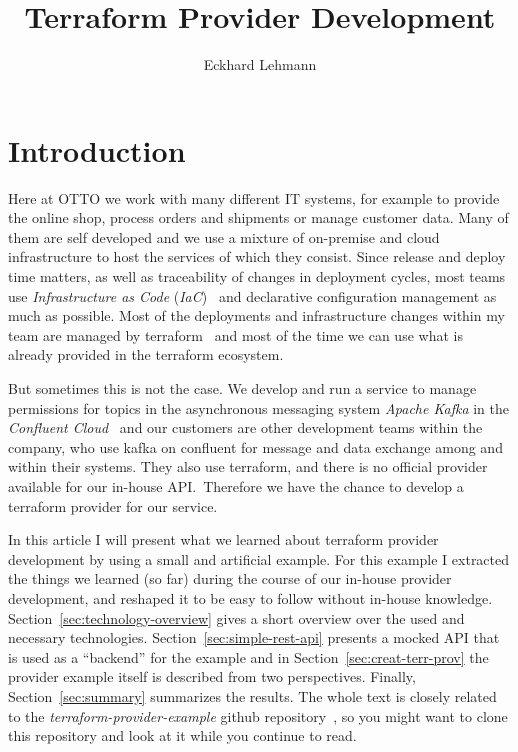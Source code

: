 \documentclass[paper=a4,11pt,numbers=noenddot]{article}
\title{Terraform Provider Development}
\author{Eckhard Lehmann}
\begin{document}
\maketitle
\tableofcontents

\section{Introduction}

Here at OTTO we work with many different IT systems, for example to provide the online shop, process orders and shipments or manage customer data. Many of them are self developed and we use a mixture of on-premise and cloud infrastructure to host the services of which they consist. Since release and deploy time matters, as well as traceability of changes in deployment cycles, most teams use \emph{Infrastructure as Code} (\emph{IaC})~\autocite{morris_infrastructure_as_code_2025} and declarative configuration management as much as possible. Most of the deployments and infrastructure changes within my team are managed by terraform~\autocite{noauthor_terraform_nodate} and most of the time we can use what is already provided in the terraform ecosystem.

But sometimes this is not the case. We develop and run a service to manage permissions for topics in the asynchronous messaging system \emph{Apache Kafka} in the \emph{Confluent Cloud}~\autocite{noauthor_apache_kafka_nodate, noauthor_confluent_nodate} and our customers are other development teams within the company, who use kafka on confluent for message and data exchange among and within their systems. They also use terraform, and there is no official provider available for our in-house API.\ Therefore we have the chance to develop a terraform provider for our service.

In this article I will present what we learned about terraform provider development by using a small and artificial example. For this example I extracted the things we learned (so far) during the course of our in-house provider development, and reshaped it to be easy to follow without in-house knowledge. Section~\ref{sec:technology-overview} gives a short overview over the used and necessary technologies. Section~\ref{sec:simple-rest-api} presents a mocked API that is used as a ``backend'' for the example and in Section~\ref{sec:creat-terr-prov} the provider example itself is described from two perspectives. Finally, Section~\ref{sec:summary} summarizes the results. The whole text is closely related to the \emph{terraform-provider-example} github repository~\autocite{ecky-l_terraform-provider-example_nodate}, so you might want to clone this repository and look at it while you continue to read.
\end{document}

